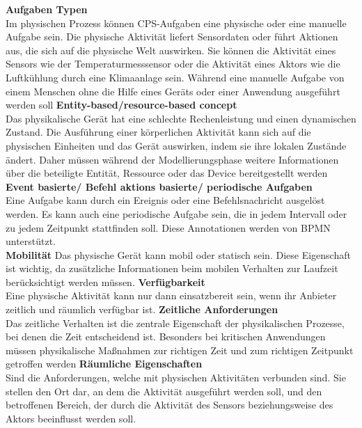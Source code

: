 \documentclass[a4paper, 12pt, twoside, headsepline=true]{scrartcl} %
\begin{document}
\textbf{Aufgaben Typen}
\\
Im physischen Prozess können CPS-Aufgaben eine physische oder eine manuelle Aufgabe sein. Die physische Aktivität liefert Sensordaten oder führt Aktionen aus, die sich auf die physische Welt auswirken. Sie können die Aktivität eines Sensors wie der Temperaturmesssensor oder die Aktivität eines Aktors wie die Luftkühlung durch eine Klimaanlage sein. Während eine manuelle Aufgabe von einem Menschen ohne die Hilfe eines Geräts oder einer Anwendung ausgeführt werden soll
\newline
\textbf{Entity-based/resource-based concept}
\\
Das physikalische Gerät hat eine schlechte Rechenleistung und einen dynamischen Zustand. Die Ausführung einer körperlichen Aktivität kann sich auf die physischen Einheiten und das Gerät auswirken, indem sie ihre lokalen Zustände ändert. Daher müssen während der Modellierungsphase weitere Informationen über die beteiligte Entität, Ressource oder das Device bereitgestellt werden
\newline
\textbf{Event basierte/ Befehl aktions basierte/ periodische Aufgaben}
\\
Eine Aufgabe kann durch ein Ereignis oder eine Befehlsnachricht ausgelöst werden. Es kann auch eine periodische Aufgabe sein, die in jedem Intervall oder zu jedem Zeitpunkt stattfinden soll. Diese Annotationen werden von BPMN unterstützt.
\\
\textbf{Mobilität}
\newline
Das physische Gerät kann mobil oder statisch sein. Diese Eigenschaft ist wichtig, da zusätzliche Informationen beim mobilen Verhalten zur Laufzeit berücksichtigt werden müssen.
\newline
\textbf{Verfügbarkeit}
\\
Eine physische Aktivität kann nur dann einsatzbereit sein, wenn ihr Anbieter zeitlich und räumlich verfügbar ist.
\newline
\textbf{Zeitliche Anforderungen}
\\
Das zeitliche Verhalten ist die zentrale Eigenschaft der physikalischen Prozesse, bei denen die Zeit entscheidend ist. Besonders bei kritischen Anwendungen müssen physikalische Maßnahmen zur richtigen Zeit und zum richtigen Zeitpunkt getroffen werden
\newline
\textbf{Räumliche Eigenschaften}
\\
Sind die Anforderungen, welche mit physischen Aktivitäten verbunden sind. Sie stellen den Ort dar, an dem die Aktivität ausgeführt werden soll, und den betroffenen Bereich, der durch die Aktivität des Sensors beziehungsweise des Aktors beeinflusst werden soll.
\end{document}
